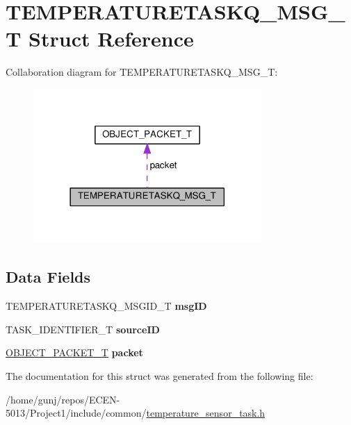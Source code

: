 \hypertarget{structTEMPERATURETASKQ__MSG__T}{}\section{T\+E\+M\+P\+E\+R\+A\+T\+U\+R\+E\+T\+A\+S\+K\+Q\+\_\+\+M\+S\+G\+\_\+T Struct Reference}
\label{structTEMPERATURETASKQ__MSG__T}


Collaboration diagram for T\+E\+M\+P\+E\+R\+A\+T\+U\+R\+E\+T\+A\+S\+K\+Q\+\_\+\+M\+S\+G\+\_\+T\+:
\nopagebreak
\begin{figure}[H]
\begin{center}
\leavevmode
\includegraphics[width=246pt]{structTEMPERATURETASKQ__MSG__T__coll__graph}
\end{center}
\end{figure}
\subsection*{Data Fields}
\begin{DoxyCompactItemize}
\item 
T\+E\+M\+P\+E\+R\+A\+T\+U\+R\+E\+T\+A\+S\+K\+Q\+\_\+\+M\+S\+G\+I\+D\+\_\+T {\bfseries msg\+ID}\hypertarget{structTEMPERATURETASKQ__MSG__T_a3193f82c175e24995eae8c2819c410e3}{}\label{structTEMPERATURETASKQ__MSG__T_a3193f82c175e24995eae8c2819c410e3}

\item 
T\+A\+S\+K\+\_\+\+I\+D\+E\+N\+T\+I\+F\+I\+E\+R\+\_\+T {\bfseries source\+ID}\hypertarget{structTEMPERATURETASKQ__MSG__T_ae8775f7bc7322da94b6827c42f28ffd1}{}\label{structTEMPERATURETASKQ__MSG__T_ae8775f7bc7322da94b6827c42f28ffd1}

\item 
\hyperlink{structOBJECT__PACKET__T}{O\+B\+J\+E\+C\+T\+\_\+\+P\+A\+C\+K\+E\+T\+\_\+T} {\bfseries packet}\hypertarget{structTEMPERATURETASKQ__MSG__T_ad8ac382a5319e5252b1af86b45333fb8}{}\label{structTEMPERATURETASKQ__MSG__T_ad8ac382a5319e5252b1af86b45333fb8}

\end{DoxyCompactItemize}


The documentation for this struct was generated from the following file\+:\begin{DoxyCompactItemize}
\item 
/home/gunj/repos/\+E\+C\+E\+N-\/5013/\+Project1/include/common/\hyperlink{temperature__sensor__task_8h}{temperature\+\_\+sensor\+\_\+task.\+h}\end{DoxyCompactItemize}
